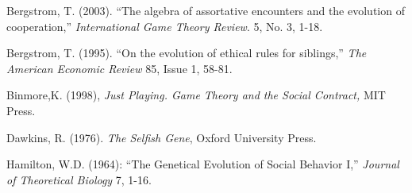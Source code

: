 \documentclass[12pt]{article}
\begin{document}
\newpage
\begin{thebibliography}{99}




\bibitem{} Bergstrom, T. (2003). ``The algebra of assortative encounters and the evolution of cooperation,'' \textit{International Game Theory
Review}. 5, No. 3, 1-18.

\bibitem{} Bergstrom, T. (1995). ``On the evolution of ethical rules for siblings,'' \textit{The American Economic Review} 85, Issue 1, 58-81.

\bibitem{} Binmore,K. (1998), \textit{Just Playing. Game Theory and the Social Contract, }MIT Press.

\bibitem{} Dawkins, R. (1976). \textit{The Selfish Gene}, Oxford University Press.

\bibitem{} Hamilton, W.D. (1964): ``The Genetical Evolution of Social Behavior I,'' \textit{Journal of Theoretical Biology} 7, 1-16.




\end{thebibliography}
\end{document}
